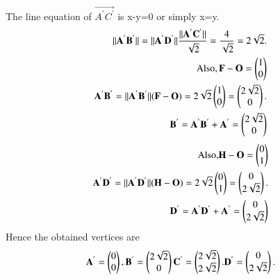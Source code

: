 \documentclass[journal,12pt,twocolumn]{IEEEtran}
\begin{document}
The line equation of $\vec{A^{'}C^{'}}$ is x-y=0 or simply x=y.\\
\begin{align}
\begin{split}
\Vert\mathbf{A^{'}B^{'}}\Vert =\Vert\mathbf{A^{'}D^{'}}\Vert \frac{\Vert\mathbf{A^{'}C^{'}}\Vert}{\sqrt{2}} = \frac{4}{\sqrt{2}}=2\sqrt{2}.\\
\text{Also}, \mathbf{F}-\mathbf{O} = \begin{pmatrix}1\\0\end{pmatrix}\\
\mathbf{A^{'}B^{'}} = \Vert\mathbf{A^{'}B^{'}}\Vert(\mathbf{F}-\mathbf{O)}=2\sqrt{2}\begin{pmatrix}1\\0\end{pmatrix}=\begin{pmatrix}2\sqrt{2}\\0\end{pmatrix}.\\
\mathbf{B^{'}} = \mathbf{A^{'}B^{'}}+\mathbf{A^{'}}=\begin{pmatrix}2\sqrt{2}\\0\end{pmatrix}\\
\end{split}
\end{align}
\begin{align}
\begin{split}
\text{Also,} \mathbf{H}-\mathbf{O} = \begin{pmatrix}0\\1\end{pmatrix}\\
\mathbf{A^{'}D^{'}} = \Vert\mathbf{A^{'}D^{'}}\Vert(\mathbf{H}-\mathbf{O})=2\sqrt{2}\begin{pmatrix}0\\1\end{pmatrix}=\begin{pmatrix}0\\2\sqrt{2}\end{pmatrix}.\\
\mathbf{D^{'}} = \mathbf{A^{'}D^{'}}+\mathbf{A^{'}}=\begin{pmatrix}0\\2\sqrt{2}\end{pmatrix}\\
\end{split}
\end{align}
Hence the obtained vertices are 
\begin{align}
\begin{split}
\mathbf{A^{'}} = \begin{pmatrix}0 \\ 0\end{pmatrix},
\mathbf{B^{'}} = \begin{pmatrix}2\sqrt{2}\\0\end{pmatrix}
\mathbf{C^{'}} = \begin{pmatrix}2\sqrt{2}\\2\sqrt{2}\end{pmatrix}.
\mathbf{D^{'}} = \begin{pmatrix}0\\2\sqrt{2}\end{pmatrix}.
\end{split}
\end{align}
\end{document}
